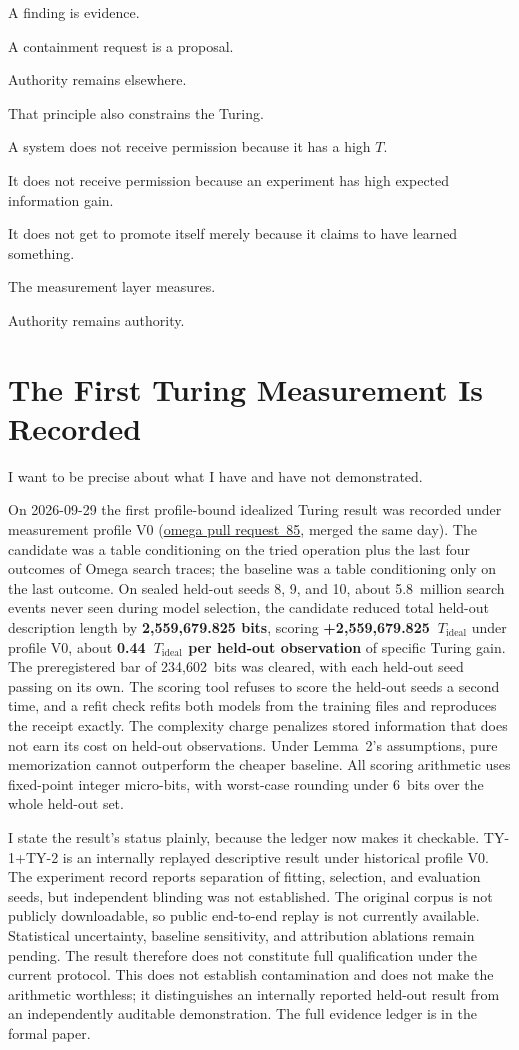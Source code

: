 \documentclass[11pt]{article}
\begin{document}
A finding is evidence.

A containment request is a proposal.

Authority remains elsewhere.

That principle also constrains the Turing.

A system does not receive permission because it has a high \(T\).

It does not receive permission because an experiment has high expected information gain.

It does not get to promote itself merely because it claims to have learned something.

The measurement layer measures.

Authority remains authority.

\section{The First Turing Measurement Is Recorded}

I want to be precise about what I have and have not demonstrated.

On 2026-09-29 the first profile-bound idealized Turing result was recorded under measurement profile V0 (\href{https://github.com/aien-dev/omega/pull/85}{omega pull request~85}, merged the same day). The candidate was a table conditioning on the tried operation plus the last four outcomes of Omega search traces; the baseline was a table conditioning only on the last outcome. On sealed held-out seeds 8, 9, and 10, about 5.8~million search events never seen during model selection, the candidate reduced total held-out description length by \textbf{2,559,679.825 bits}, scoring \textbf{+2,559,679.825~$T_{\mathrm{ideal}}$} under profile V0, about \textbf{0.44~$T_{\mathrm{ideal}}$ per held-out observation} of specific Turing gain. The preregistered bar of 234,602~bits was cleared, with each held-out seed passing on its own. The scoring tool refuses to score the held-out seeds a second time, and a refit check refits both models from the training files and reproduces the receipt exactly. The complexity charge penalizes stored information that does not earn its cost on held-out observations. Under Lemma~2's assumptions, pure memorization cannot outperform the cheaper baseline. All scoring arithmetic uses fixed-point integer micro-bits, with worst-case rounding under 6~bits over the whole held-out set.

I state the result's status plainly, because the ledger now makes it checkable. TY-1+TY-2 is an internally replayed descriptive result under historical profile V0. The experiment record reports separation of fitting, selection, and evaluation seeds, but independent blinding was not established. The original corpus is not publicly downloadable, so public end-to-end replay is not currently available. Statistical uncertainty, baseline sensitivity, and attribution ablations remain pending. The result therefore does not constitute full qualification under the current protocol. This does not establish contamination and does not make the arithmetic worthless; it distinguishes an internally reported held-out result from an independently auditable demonstration. The full evidence ledger is in the formal paper.
\end{document}
